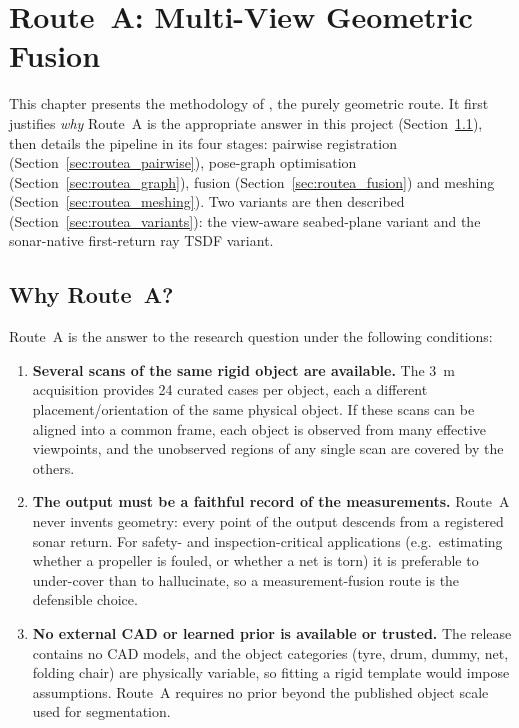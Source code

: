 \chapter{Route~A: Multi-View Geometric Fusion}
\label{ch:routeA}

This chapter presents the methodology of \routeA, the purely geometric route.
It first justifies \emph{why} Route~A is the appropriate answer in this
project (Section~\ref{sec:why_routeA}), then details the pipeline in its four
stages: pairwise registration (Section~\ref{sec:routea_pairwise}), pose-graph
optimisation (Section~\ref{sec:routea_graph}), fusion (Section~\ref{sec:routea_fusion})
and meshing (Section~\ref{sec:routea_meshing}). Two variants are then described
(Section~\ref{sec:routea_variants}): the view-aware seabed-plane variant and the
sonar-native first-return ray TSDF variant.

\section{Why Route~A?}
\label{sec:why_routeA}

Route~A is the answer to the research question under the following conditions:

\begin{enumerate}
  \item \textbf{Several scans of the same rigid object are available.} The
  \suop{} 3~m acquisition provides 24 curated cases per object, each a
  different placement/orientation of the same physical object. If these scans
  can be aligned into a common frame, each object is observed from many
  effective viewpoints, and the unobserved regions of any single scan are
  covered by the others.
  \item \textbf{The output must be a faithful record of the measurements.}
  Route~A never invents geometry: every point of the output descends from a
  registered sonar return. For safety- and inspection-critical applications
  (e.g.\ estimating whether a propeller is fouled, or whether a net is torn)
  it is preferable to under-cover than to hallucinate, so a measurement-fusion
  route is the defensible choice.
  \item \textbf{No external CAD or learned prior is available or trusted.}
  The \suop{} release contains no CAD models, and the object categories (tyre,
  drum, dummy, net, folding chair) are physically variable, so fitting a rigid
  template would impose assumptions. Route~A requires no prior beyond the
  published object scale used for segmentation.
\end{enumerate}

